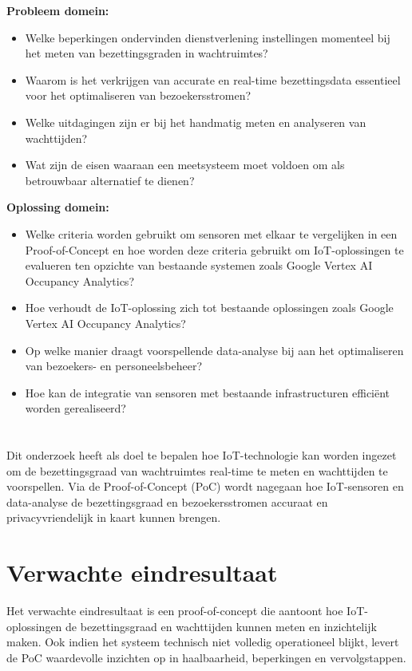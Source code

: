 \textbf{Probleem domein:}
\begin{itemize}
    \item Welke beperkingen ondervinden dienstverlening instellingen momenteel bij het meten van bezettingsgraden in wachtruimtes?
    \item Waarom is het verkrijgen van accurate en real-time bezettingsdata essentieel voor het optimaliseren van bezoekersstromen?
    \item Welke uitdagingen zijn er bij het handmatig meten en analyseren van wachttijden?
    \item Wat zijn de eisen waaraan een meetsysteem moet voldoen om als betrouwbaar alternatief te dienen?
\end{itemize}

\textbf{Oplossing domein:}
\begin{itemize}
    \item Welke criteria worden gebruikt om sensoren met elkaar te vergelijken in een Proof-of-Concept en hoe worden deze criteria gebruikt om IoT-oplossingen te evalueren ten opzichte van bestaande systemen zoals Google Vertex AI Occupancy Analytics?
    \item Hoe verhoudt de IoT-oplossing zich tot bestaande oplossingen zoals Google Vertex AI Occupancy Analytics?
    \item Op welke manier draagt voorspellende data-analyse bij aan het optimaliseren van bezoekers- en personeelsbeheer?
    \item Hoe kan de integratie van sensoren met bestaande infrastructuren efficiënt worden gerealiseerd?
\end{itemize}


\section{}%
\label{sec:onderzoeksdoelstelling}
Dit onderzoek heeft als doel te bepalen hoe IoT-technologie kan worden ingezet om de bezettingsgraad van wachtruimtes real-time te meten en wachttijden te voorspellen. Via de Proof-of-Concept (PoC) wordt nagegaan hoe IoT-sensoren en data-analyse de bezettingsgraad en bezoekersstromen accuraat en privacyvriendelijk in kaart kunnen brengen.


\section{Verwachte eindresultaat} 
Het verwachte eindresultaat is een proof-of-concept die aantoont hoe IoT-oplossingen de bezettingsgraad en wachttijden kunnen meten en inzichtelijk maken. Ook indien het systeem technisch niet volledig operationeel blijkt, levert de PoC waardevolle inzichten op in haalbaarheid, beperkingen en vervolgstappen.


